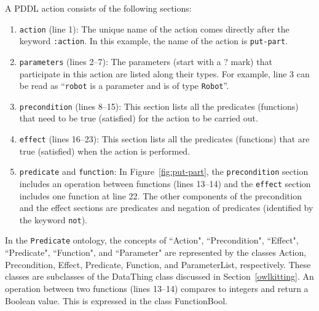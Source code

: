 A PDDL action consists of the following sections:
\begin{enumerate}
  \item \texttt{action} (line 1): The unique name of the action comes directly after the keyword \texttt{:action}. In this example, the name of the action is \texttt{put-part}.
  \item \texttt{parameters} (lines 2--7): The parameters (start with a ? mark) that participate in this action are listed along their types. For example, line 3 can be read as ``\texttt{robot} is a parameter and is of type \texttt{Robot}''.
  \item \texttt{precondition} (lines 8--15): This section lists all the predicates (functions) that need to be true (satisfied) for the action to be carried out.
  \item \texttt{effect} (lines 16--23): This section lists all the predicates (functions) that are true (satisfied) when the action is performed.
   \item \texttt{predicate} and \texttt{function}: In Figure~\ref{fig:put-part}, the \texttt{precondition} section includes an operation between functions (lines 13--14) and the \texttt{effect} section includes one function at line 22. The other components of the precondition and the effect sections are predicates and negation of predicates (identified by the keyword \texttt{not}).
\end{enumerate}

In the \texttt{Predicate} ontology, the concepts of ``Action", ``Precondition", ``Effect", ``Predicate", ``Function", and ``Parameter" are represented by the classes \textsf{Action}, \textsf{Precondition}, \textsf{Effect}, \textsf{Predicate}, \textsf{Function}, and \textsf{ParameterList}, respectively. These classes are subclasses of the \textsf{DataThing} class discussed in Section~\ref{owlkitting}. An operation between two functions (lines 13--14) compares to integers and return a Boolean value. This is expressed in the class \textsf{FunctionBool}. 

